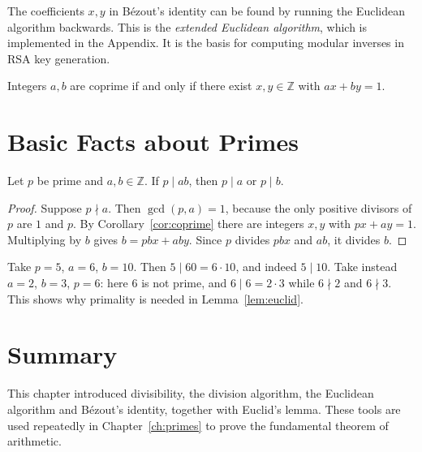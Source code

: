 \begin{remark}
The coefficients $x,y$ in Bézout's identity can be found by running the Euclidean algorithm backwards. This is the \emph{extended Euclidean algorithm}, which is implemented in the Appendix. It is the basis for computing modular inverses in RSA key generation.
\end{remark}

\begin{corollary}\label{cor:coprime}
Integers $a,b$ are coprime if and only if there exist $x,y\in\mathbb{Z}$ with $ax+by=1$.
\end{corollary}

\section{Basic Facts about Primes}

\begin{lemma}\label{lem:euclid}
Let $p$ be prime and $a,b\in\mathbb{Z}$. If $p\mid ab$, then $p\mid a$ or $p\mid b$.
\end{lemma}

\begin{proof}
Suppose $p\nmid a$. Then $\gcd(p,a)=1$, because the only positive divisors of $p$ are $1$ and $p$. By Corollary~\ref{cor:coprime} there are integers $x,y$ with $px+ay=1$. Multiplying by $b$ gives $b=pbx+aby$. Since $p$ divides $pbx$ and $ab$, it divides $b$.
\end{proof}

\begin{example}
Take $p=5$, $a=6$, $b=10$. Then $5\mid 60=6\cdot 10$, and indeed $5\mid 10$. Take instead $a=2$, $b=3$, $p=6$: here $6$ is not prime, and $6\mid 6=2\cdot 3$ while $6\nmid 2$ and $6\nmid 3$. This shows why primality is needed in Lemma~\ref{lem:euclid}.
\end{example}

\section{Summary}

This chapter introduced divisibility, the division algorithm, the Euclidean algorithm and Bézout's identity, together with Euclid's lemma. These tools are used repeatedly in Chapter~\ref{ch:primes} to prove the fundamental theorem of arithmetic.
